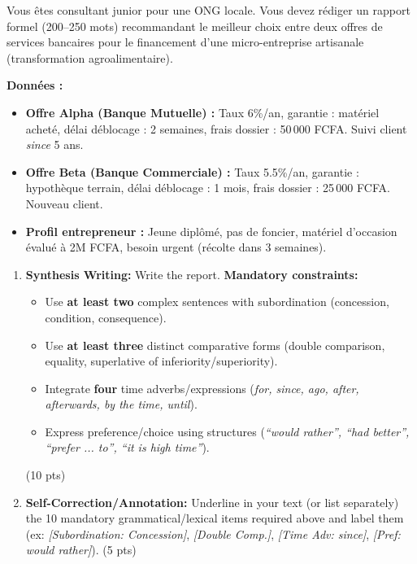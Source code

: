 \documentclass[11pt]{article}
\begin{document}
\begin{exercice}
Vous êtes consultant junior pour une ONG locale. Vous devez rédiger un rapport formel (200--250 mots) recommandant le meilleur choix entre deux offres de services bancaires pour le financement d'une micro-entreprise artisanale (transformation agroalimentaire).

\textbf{Données :}
\begin{itemize}
    \item \textbf{Offre Alpha (Banque Mutuelle) :} Taux 6\%/an, garantie : matériel acheté, délai déblocage : 2 semaines, frais dossier : 50\,000 FCFA. Suivi client \textit{since} 5 ans.
    \item \textbf{Offre Beta (Banque Commerciale) :} Taux 5.5\%/an, garantie : hypothèque terrain, délai déblocage : 1 mois, frais dossier : 25\,000 FCFA. Nouveau client.
    \item \textbf{Profil entrepreneur :} Jeune diplômé, pas de foncier, matériel d'occasion évalué à 2M FCFA, besoin urgent (récolte dans 3 semaines).
\end{itemize}

\begin{enumerate}
    \item \textbf{Synthesis Writing:} Write the report. \textbf{Mandatory constraints:}
    \begin{itemize}
        \item Use \textbf{at least two} complex sentences with subordination (concession, condition, consequence).
        \item Use \textbf{at least three} distinct comparative forms (double comparison, equality, superlative of inferiority/superiority).
        \item Integrate \textbf{four} time adverbs/expressions (\textit{for, since, ago, after, afterwards, by the time, until}).
        \item Express preference/choice using structures (\textit{``would rather'', ``had better'', ``prefer ... to'', ``it is high time''}).
    \end{itemize}
    (10 pts)
    \item \textbf{Self-Correction/Annotation:} Underline in your text (or list separately) the 10 mandatory grammatical/lexical items required above and label them (ex: \textit{[Subordination: Concession]}, \textit{[Double Comp.]}, \textit{[Time Adv: since]}, \textit{[Pref: would rather]}). (5 pts)
\end{enumerate}
\end{exercice}
\end{document}
